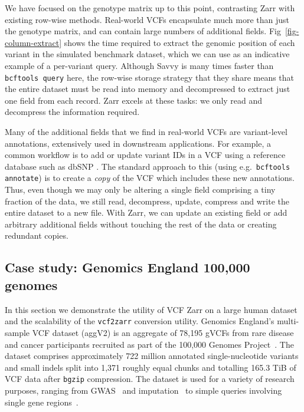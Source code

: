 \documentclass[a4paper,num-refs]{oup-contemporary}
\begin{document}
We have focused on the genotype matrix up to this point, contrasting
Zarr with existing row-wise methods.
Real-world VCFs encapsulate much more than just the genotype
matrix, and can contain large numbers of additional fields.
Fig~\ref{fig-column-extract} shows the time required to extract 
the genomic position of each variant in the simulated benchmark 
dataset, which we can use as an indicative example of a per-variant 
query. Although Savvy is many times faster than \texttt{bcftools query}
here, the row-wise storage strategy that they share means that 
the entire dataset must be read into memory and 
decompressed to extract just one field from each record. Zarr
excels at these tasks: we only read and decompress the information required.

Many of the additional fields that we find in real-world VCFs are 
variant-level annotations, extensively used in downstream applications.
For example, a common workflow is to 
add or update variant IDs in a VCF using a reference database
such as dbSNP \cite{Sherry2001dbSNP}. The standard approach to this
(using e.g.\ \texttt{bcftools annotate}) is to create a \emph{copy} of 
the VCF which includes these new annotations. Thus, even though 
we may only be altering a single field comprising a tiny fraction 
of the data, we still read, decompress, update, compress and 
write the entire dataset to a new file. With Zarr,
we can update an existing field or add arbitrary additional
fields without touching the rest of the data or creating redundant
copies.

\subsection{Case study: Genomics England 100,000 genomes}
In this section we demonstrate the utility of VCF Zarr on a large human dataset
and the scalability of the \texttt{vcf2zarr} conversion utility.
Genomics England’s multi-sample VCF dataset (aggV2) is an 
aggregate of 78,195 gVCFs from rare disease and cancer participants 
recruited as part of the 100,000 Genomes Project~\cite{turnbull2018100}. 
The dataset comprises approximately 722 million annotated single-nucleotide 
variants and small indels split into 1,371 roughly equal chunks and 
totalling 165.3 TiB of VCF data after \texttt{bgzip} compression. 
The dataset is used for a variety of research purposes, ranging from 
GWAS~\cite{kousathanas2022whole} and 
imputation~\cite{shi2023genomics} to 
simple queries involving single gene 
regions~\cite{leggatt2023genotype,lam2023repeat}.
\end{document}
